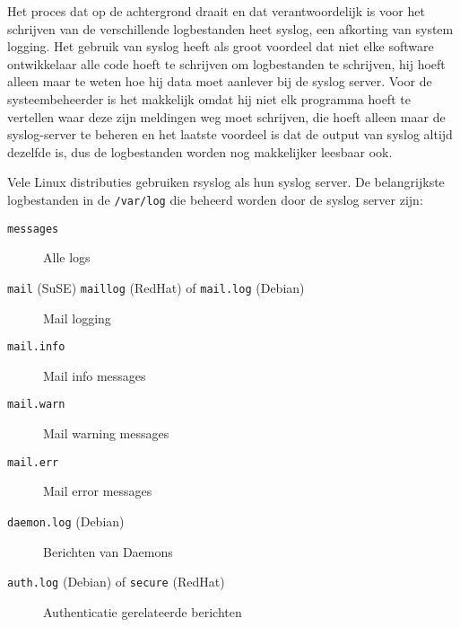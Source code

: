 Het proces dat op de achtergrond draait en dat verantwoordelijk is voor het schrijven van de verschillende logbestanden heet syslog, een afkorting van system logging. Het gebruik van syslog heeft als groot voordeel dat niet elke software ontwikkelaar alle code hoeft te schrijven om logbestanden te schrijven, hij hoeft alleen maar te weten hoe hij data moet aanlever bij de syslog server. Voor de systeembeheerder is het makkelijk omdat hij niet elk programma hoeft te vertellen waar deze zijn meldingen weg moet schrijven, die hoeft alleen maar de syslog-server te beheren en het laatste voordeel is dat de output van syslog altijd dezelfde is, dus de logbestanden worden nog makkelijker leesbaar ook.

Vele Linux distributies gebruiken rsyslog als hun syslog server. De belangrijkste logbestanden in de \texttt{/var/log} die beheerd worden door de syslog server zijn:
\begin{description}
\item[\texttt{messages}] Alle logs
\item[\texttt{mail} (SuSE) \texttt{maillog} (RedHat) of \texttt{mail.log} (Debian)] Mail logging
\item[\texttt{mail.info}] Mail info messages
\item[\texttt{mail.warn}] Mail warning messages
\item[\texttt{mail.err}] Mail error messages
\item[\texttt{daemon.log} (Debian)] Berichten van Daemons
\item[\texttt{auth.log} (Debian) of \texttt{secure} (RedHat)] Authenticatie gerelateerde berichten
\end{description}

